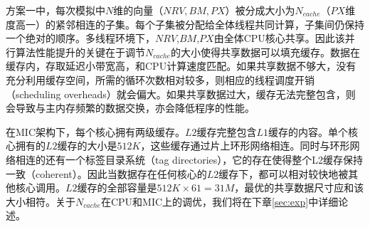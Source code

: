 方案一中，每次模拟中$N$维的向量（$NRV, BM, PX$）被分成大小为$N_{cache}$（$PX$维度高一）的紧邻相连的子集。每个子集被分配给全体线程共同计算，子集间仍保持一个绝对的顺序。多线程环境下，$NRV$,$BM$,$PX$由全体CPU核心共享。因此该并行算法性能提升的关键在于调节$N_{cache}$的大小使得共享数据可以填充缓存。数据在缓存内，存取延迟小带宽高，和CPU计算速度匹配。如果共享数据不够大，没有充分利用缓存空间，所需的循环次数相对较多，则相应的线程调度开销（scheduling overheads）就会偏大。如果共享数据过大，缓存无法完整包含，则会导致与主内存频繁的数据交换，亦会降低程序的性能。

在MIC架构下，每个核心拥有两级缓存。$L2$缓存完整包含$L1$缓存的内容。单个核心拥有的$L2$缓存的大小是$512K$，这些缓存通过片上环形网络相连。同时与环形网络相连的还有一个标签目录系统（tag directories），它的存在使得整个L2缓存保持一致（coherent）。因此当数据存在任何核心的$L2$缓存下，都可以相对较快地被其他核心调用。$L2$缓存的全部容量是$512K\times 61 = 31M$，最优的共享数据尺寸应和该大小相符。关于$N_{cache}$在CPU和MIC上的调优，我们将在下章\ref{sec:exp}中详细论述。


